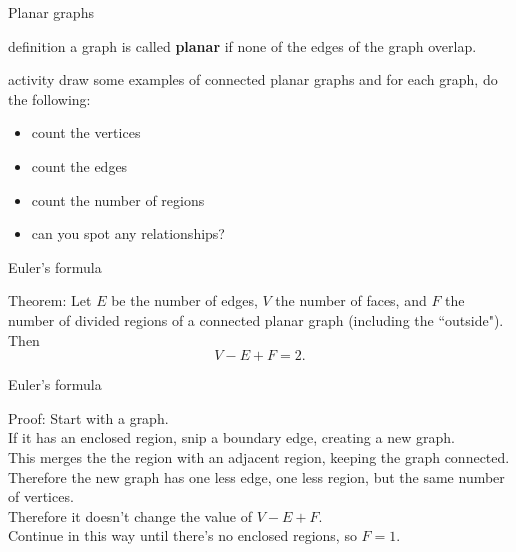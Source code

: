 \documentclass{beamer}
\begin{document}
\begin{frame}{Planar graphs}
\pause
  \begin{block}{definition}
    a graph is called \textbf{planar} if none of the edges of the graph overlap.
  \end{block}
\pause
  \begin{block}{activity}
    draw some examples of connected planar graphs and for each graph, do the following:
    \begin{itemize}
      \item  count the vertices
      \item  count the edges
      \item  count the number of regions
      \item  can you spot any relationships?
    \end{itemize}
  \end{block}
\end{frame}

\begin{frame}{Euler's formula}
\pause
  \begin{block}{Theorem:}
    Let $E$ be the number of edges, $V$ the number of faces, and $F$ the number of divided regions of a connected planar graph (including the ``outside").  Then
  $$V-E+F = 2.$$
  \end{block}
\end{frame}

\begin{frame}{Euler's formula}
\pause
  \begin{block}{Proof:}
    Start with a graph.\\
\pause
    If it has an enclosed region, snip a boundary edge, creating a new graph.\\
\pause
    This merges the the region with an adjacent region, keeping the graph connected.\\
\pause
    Therefore the new graph has one less edge, one less region, but the same number of vertices.\\
\pause
    Therefore it doesn't change the value of $V-E+F$.\\
\pause
    Continue in this way until there's no enclosed regions, so $F=1$.
  \end{block}
\end{frame}
\end{document}
